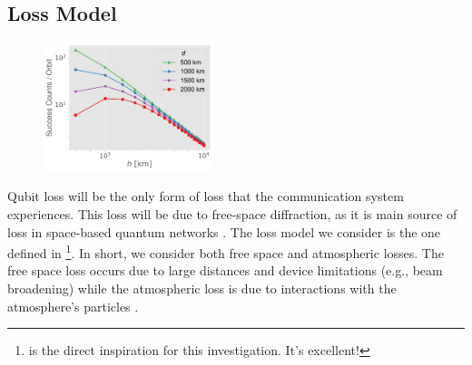 
\subsection{Loss Model}

\begin{figure}
    \centering
    \vspace{-.1\baselineskip}
    \includegraphics[width=0.44\textwidth]{figures/success-counts.pdf}
    \caption{}
    \label{fig:success-counts}
\end{figure}

Qubit loss will be the only form of loss that the communication system experiences. This loss will be due to free-space diffraction, as it is main source of loss in space-based quantum networks \cite{khatri2021}. The loss model we consider is the one defined in \cite{khatri2021}\footnote{\cite{khatri2021} is the direct inspiration for this investigation. It's excellent!}. In short, we consider both free space and atmospheric losses. The free space loss occurs due to large distances and device limitations (e.g., beam broadening) while the atmospheric loss is due to interactions with the atmosphere's particles \cite{khatri2021}.


